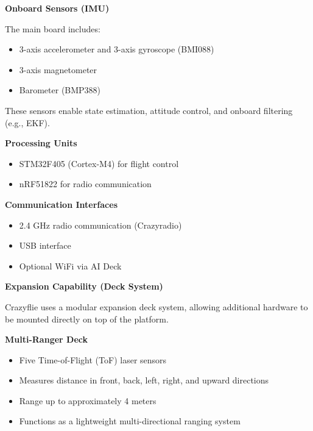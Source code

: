\documentclass{book}
\providecommand{\ProjectDeepHeading}[2]{%
    \par\medskip\noindent\textbf{#2}\par\smallskip
}
\begin{document}
        \ProjectDeepHeading{5}{Onboard Sensors (IMU)}
            
            The main board includes:
            
            \begin{itemize}
                \item 3-axis accelerometer and 3-axis gyroscope (BMI088)
                \item 3-axis magnetometer
                \item Barometer (BMP388)
            \end{itemize}
            
            These sensors enable state estimation, attitude control, and onboard filtering (e.g., EKF).
        
        \ProjectDeepHeading{5}{Processing Units}
            
            \begin{itemize}
                \item STM32F405 (Cortex-M4) for flight control
                \item nRF51822 for radio communication
            \end{itemize}
        
        \ProjectDeepHeading{5}{Communication Interfaces}
            
            \begin{itemize}
                \item 2.4 GHz radio communication (Crazyradio)
                \item USB interface
                \item Optional WiFi via AI Deck
            \end{itemize}
        
        \ProjectDeepHeading{5}{Expansion Capability (Deck System)}
            
            Crazyflie uses a modular expansion deck system, allowing additional hardware to be mounted directly on top of the platform.
            
            \ProjectDeepHeading{6}{Multi-Ranger Deck}
            
            \begin{itemize}
                \item Five Time-of-Flight (ToF) laser sensors
                \item Measures distance in front, back, left, right, and upward directions
                \item Range up to approximately 4 meters
                \item Functions as a lightweight multi-directional ranging system
                \end{itemize}
            
\end{document}

